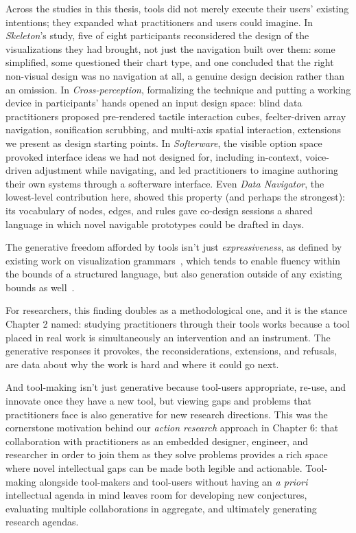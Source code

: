 \documentclass[12pt]{cmuthesis}
\begin{document}
Across the studies in this thesis, tools did not merely execute their users' existing intentions; they expanded what practitioners and users could imagine. In \textit{Skeleton}'s study, five of eight participants reconsidered the design of the visualizations they had brought, not just the navigation built over them: some simplified, some questioned their chart type, and one concluded that the right non-visual design was no navigation at all, a genuine design decision rather than an omission. In \textit{Cross-perception}, formalizing the technique and putting a working device in participants' hands opened an input design space: blind data practitioners proposed pre-rendered tactile interaction cubes, feelter-driven array navigation, sonification scrubbing, and multi-axis spatial interaction, extensions we present as design starting points. In \textit{Softerware}, the visible option space provoked interface ideas we had not designed for, including in-context, voice-driven adjustment while navigating, and led practitioners to imagine authoring their own systems through a softerware interface. Even \textit{Data Navigator}, the lowest-level contribution here, showed this property (and perhaps the strongest): its vocabulary of nodes, edges, and rules gave co-design sessions a shared language in which novel navigable prototypes could be drafted in days.

The generative freedom afforded by tools isn't just \textit{expressiveness}, as defined by existing work on visualization grammars~\cite{Wilkinson2011,Satyanarayan2017VegaLite}, which tends to enable fluency within the bounds of a structured language, but also generation outside of any existing bounds as well~\cite{BeaudouinLafon2021}.

For researchers, this finding doubles as a methodological one, and it is the stance Chapter 2 named: studying practitioners through their tools works because a tool placed in real work is simultaneously an intervention and an instrument. The generative responses it provokes, the reconsiderations, extensions, and refusals, are data about why the work is hard and where it could go next.

And tool-making isn't just generative because tool-users appropriate, re-use, and innovate once they have a new tool, but viewing gaps and problems that practitioners face is also generative for new research directions. This was the cornerstone motivation behind our \textit{action research} approach in Chapter 6: that collaboration with practitioners as an embedded designer, engineer, and researcher in order to join them as they solve problems provides a rich space where novel intellectual gaps can be made both legible and actionable. Tool-making alongside tool-makers and tool-users without having an \textit{a priori} intellectual agenda in mind leaves room for developing new conjectures, evaluating multiple collaborations in aggregate, and ultimately generating research agendas.
\end{document}
